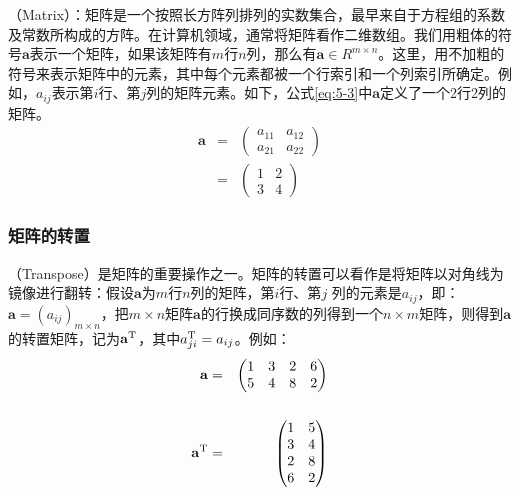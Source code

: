 （Matrix）：矩阵是一个按照长方阵列排列的实数集合，最早来自于方程组的系数及常数所构成的方阵。在计算机领域，通常将矩阵看作二维数组。我们用粗体的符号$ \mathbf a $表示一个矩阵，如果该矩阵有$ m $行$ n $列，那么有$ \mathbf a\in R^{m\times n} $。这里，用不加粗的符号来表示矩阵中的元素，其中每个元素都被一个行索引和一个列索引所确定。例如，$ a_{ij} $表示第$ i $行、第$ j $列的矩阵元素。如下，公式\ref{eq:5-3}中$ \mathbf a $定义了一个2行2列的矩阵。
\begin{eqnarray}
\mathbf a & = & \begin{pmatrix}
   a_{11} & a_{12}\\
   a_{21} & a_{22}
\end{pmatrix} \nonumber \\
& = & \begin{pmatrix}
   1 & 2\\
   3 & 4
\end{pmatrix}
\label{eq:5-3}
\end{eqnarray}


\subsubsection{矩阵的转置}

（Transpose）是矩阵的重要操作之一。矩阵的转置可以看作是将矩阵以对角线为镜像进行翻转：假设$ \mathbf a $为$ m $行$ n $列的矩阵，第$ i $行、第$ j $ 列的元素是$ a_{ij} $，即：$ \mathbf a={(a_{ij})}_{m\times n} $，把$ m\times n $矩阵$ \mathbf a $的行换成同序数的列得到一个$ n\times m $矩阵，则得到$ \mathbf a $的转置矩阵，记为$ \mathbf a^{\rm T} $，其中$ a_{ji}^{\rm T}=a_{ij} $。例如：
\begin{eqnarray}
\mathbf a & = & \begin{pmatrix} 1 & 3 & 2 & 6\\5 & 4 & 8 & 2\end{pmatrix} \\ \nonumber \\
{\mathbf a}^{\rm T} & = &\begin{pmatrix} 1 & 5\\3 & 4\\2 & 8\\6 & 2\end{pmatrix}
\end{eqnarray}

